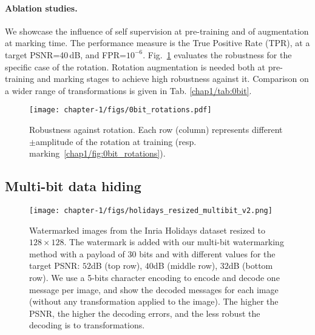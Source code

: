\paragraph*{Ablation studies.}\label{chap1/par:0bit_quantitative_results}
We showcase the influence of self supervision at pre-training and of augmentation at marking time.
The performance measure is the True Positive Rate (TPR), at a target PSNR=40\,dB, and FPR=$10^{-6}$.
Fig.~\ref{chap1/fig:0bit_rotations} evaluates the robustness for the specific case of the rotation. 
Rotation augmentation is needed both at pre-training and marking stages to achieve high robustness against it.
Comparison on a wider range of transformations is given in Tab. \ref{chap1/tab:0bit}.

\begin{figure}[b!]
    \centering
    \texttt{[image: chapter-1/figs/0bit\_rotations.pdf]}
    \caption{Robustness against rotation. Each row (column) represents different $\pm$amplitude of the rotation at training (resp. marking~\eqref{chap1/fig:0bit_rotations}). 
    }
    \label{chap1/fig:0bit_rotations}
\end{figure}



\subsection{Multi-bit data hiding}\label{chap1/sec:multibit_exp}


\begin{figure}[b!]
    \texttt{[image: chapter-1/figs/holidays\_resized\_multibit\_v2.png]}
    \caption{Watermarked images from the Inria Holidays dataset resized to $128 \times 128$. The watermark is added with our multi-bit watermarking method with a payload of $30$ bits and with different values for the target PSNR: $52$dB (top row), $40$dB (middle row), $32$dB (bottom row). 
    We use a 5-bits character encoding to encode and decode one message per image, and show the decoded messages for each image (without any transformation applied to the image). The higher the PSNR, the higher the decoding errors, and the less robust the decoding is to transformations.}
    \label{chap1/fig:holidays_resized_multibit}
\end{figure}



